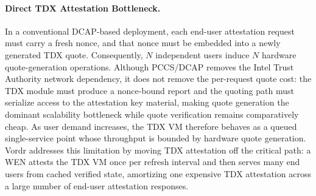 \paragraph{Direct TDX Attestation Bottleneck.}
In a conventional DCAP-based deployment, each end-user attestation request
must carry a fresh nonce, and that nonce must be embedded into a newly
generated TDX quote. Consequently, $N$ independent users induce $N$ hardware
quote-generation operations. Although PCCS/DCAP removes the Intel Trust
Authority network dependency, it does not remove the per-request quote cost:
the TDX module must produce a nonce-bound report and the quoting path must
serialize access to the attestation key material, making quote generation the
dominant scalability bottleneck while quote verification remains comparatively
cheap. As user demand increases, the TDX VM therefore behaves as a queued
single-service point whose throughput is bounded by hardware quote generation.
Vordr addresses this limitation by moving TDX attestation off the critical
path: a WEN attests the TDX VM once per refresh interval and then serves many
end users from cached verified state, amortizing one expensive TDX attestation
across a large number of end-user attestation responses.

